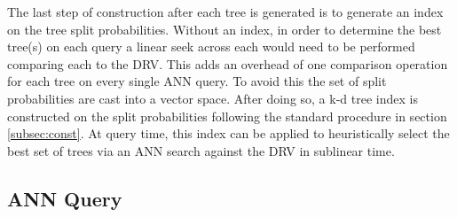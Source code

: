 The last step of construction after each tree is generated is to generate an index on the tree split probabilities.  Without an index, in order to determine the best tree(s) on each query a linear seek across each would need to be performed comparing each to the DRV.  This adds an overhead of one comparison operation for each tree on every single ANN query.  To avoid this the set of split probabilities are cast into a vector space.  After doing so, a k-d tree index is constructed on the split probabilities following the standard procedure in section \ref{subsec:const}.  At query time, this index can be applied to heuristically select the best set of trees via an ANN search against the DRV in sublinear time.

\subsection{ANN Query}

